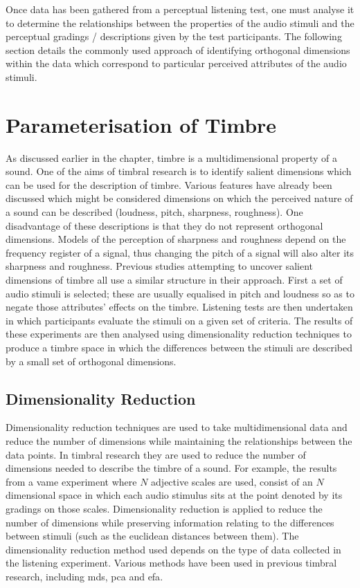 			Once data has been gathered from a perceptual listening test, one must analyse it to determine the
			relationships between the properties of the audio stimuli and the perceptual gradings /
			descriptions given by the test participants. The following section details the commonly used
			approach of identifying orthogonal dimensions within the data which correspond to particular
			perceived attributes of the audio stimuli.

\section{Parameterisation of Timbre}
\label{sec:Timbre-Parameterisation}
	As discussed earlier in the chapter, timbre is a multidimensional property of a sound. One of the aims of timbral
	research is to identify salient dimensions which can be used for the description of timbre. Various features have
	already been discussed which might be considered dimensions on which the perceived nature of a sound can be
	described (loudness, pitch, sharpness, roughness). One disadvantage of these descriptions is that they do not
	represent orthogonal dimensions. Models of the perception of sharpness and roughness depend on the frequency
	register of a signal, thus changing the pitch of a signal will also alter its sharpness and roughness. Previous
	studies attempting to uncover salient dimensions of timbre all use a similar structure in their approach.  First a
	set of audio stimuli is selected; these are usually equalised in pitch and loudness so as to negate those
	attributes' effects on the timbre. Listening tests are then undertaken in which participants evaluate the stimuli
	on a given set of criteria. The results of these experiments are then analysed using dimensionality reduction
	techniques to produce a timbre space in which the differences between the stimuli are described by a small set of
	orthogonal dimensions.

	\subsection{Dimensionality Reduction}
	\label{sec:Timbre-Parameterisation-DimensionalityReduction}
		Dimensionality reduction techniques are used to take multidimensional data and reduce the number of
		dimensions while maintaining the relationships between the data points. In timbral research they are used
		to reduce the number of dimensions needed to describe the timbre of a sound. For example, the results from
		a \acrshort{vame} experiment where $N$ adjective scales are used, consist of an $N$ dimensional space in
		which each audio stimulus sits at the point denoted by its gradings on those scales. Dimensionality
		reduction is applied to reduce the number of dimensions while preserving information relating to the
		differences between stimuli (such as the euclidean distances between them). The dimensionality reduction
		method used depends on the type of data collected in the listening experiment. Various methods have been
		used in previous timbral research, including \acrfull{mds}, \acrfull{pca} and \acrfull{efa}.

